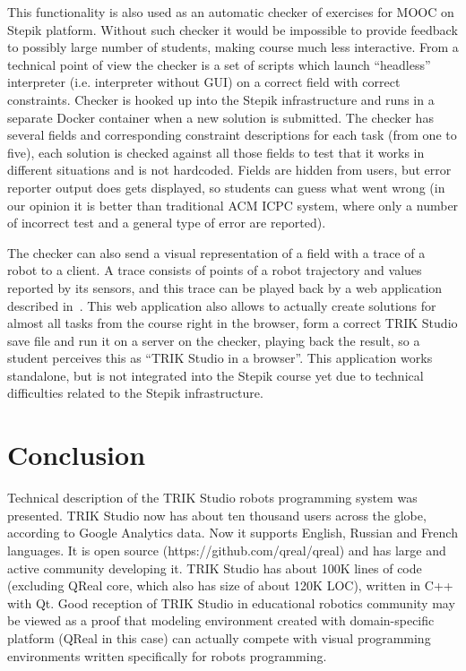 \documentclass[conference]{IEEEtran}
\begin{document}
This functionality is also used as an automatic checker of exercises for MOOC on Stepik platform. Without such checker it would be impossible to provide feedback to possibly large number of students, making course much less interactive. From a technical point of view the checker is a set of scripts which launch ``headless'' interpreter (i.e. interpreter without GUI) on a correct field with correct constraints. Checker is hooked up into the Stepik infrastructure and runs in a separate Docker container when a new solution is submitted. The checker has several fields and corresponding constraint descriptions for each task (from one to five), each solution is checked against all those fields to test that it works in different situations and is not hardcoded. Fields are hidden from users, but error reporter output does gets displayed, so students can guess what went wrong (in our opinion it is better than traditional ACM ICPC system, where only a number of incorrect test and a general type of error are reported).

The checker can also send a visual representation of a field with a trace of a robot to a client. A trace consists of points of a robot trajectory and values reported by its sensors, and this trace can be played back by a web application described in~\cite{zakharov2016web}. This web application also allows to actually create solutions for almost all tasks from the course right in the browser, form a correct TRIK Studio save file and run it on a server on the checker, playing back the result, so a student perceives this as ``TRIK Studio in a browser''. This application works standalone, but is not integrated into the Stepik course yet due to technical difficulties related to the Stepik infrastructure.

\section*{Conclusion}
\label{chapter:conclusion}

Technical description of the TRIK Studio robots programming system was presented. TRIK Studio now has about ten thousand users across the globe, according to Google Analytics data. Now it supports English, Russian and French languages. It is open source (https://github.com/qreal/qreal) and has large and active community developing it. TRIK Studio has about 100K lines of code (excluding QReal core, which also has size of about 120K LOC), written in C++ with Qt. Good reception of TRIK Studio in educational robotics community may be viewed as a proof that modeling environment created with domain-specific platform (QReal in this case) can actually compete with visual programming environments written specifically for robots programming.
\end{document}
